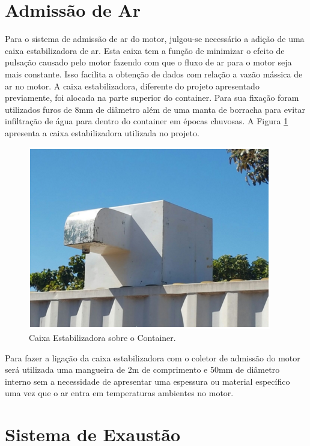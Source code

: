 \section{Admissão de Ar}

Para o sistema de admissão de ar do motor, julgou-se necessário a adição de uma caixa estabilizadora de ar. Esta caixa tem a função de minimizar o efeito de pulsação causado pelo motor fazendo com que o fluxo de ar para o motor seja mais constante. Isso facilita a obtenção de dados com relação a vazão mássica de ar no motor. A caixa estabilizadora, diferente do projeto apresentado previamente, foi alocada na parte superior do container. Para sua fixação foram utilizados furos de 8mm de diâmetro além de uma manta de borracha para evitar infiltração de água para dentro do container em épocas chuvosas. A Figura \ref{fig:caixaestabilizadora} apresenta a caixa estabilizadora utilizada no projeto.

\begin{figure}[h!]
	\centering
	\includegraphics[keepaspectratio=true,scale= 0.6]{figuras/caixa-estabilizadora.png}
	\caption{Caixa Estabilizadora sobre o Container.}
	\label{fig:caixaestabilizadora}
\end{figure}

Para fazer a ligação da caixa estabilizadora com o coletor de admissão do motor será utilizada uma mangueira de 2m de comprimento e 50mm de diâmetro interno sem a necessidade de apresentar uma espessura ou material específico uma vez que o ar entra em temperaturas ambientes no motor.

\vfill

\section{Sistema de Exaustão}

